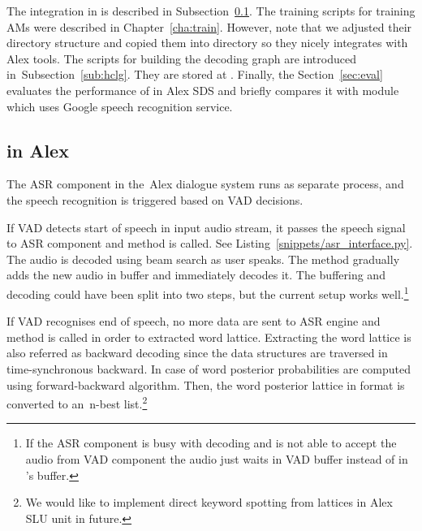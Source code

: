The  integration in  is described in Subsection~\ref{sub:asr_component}.
The training scripts for training \acp{AM} were described in Chapter~\ref{cha:train}.
However, note that we adjusted their directory structure and copied them into  directory so they nicely integrates with Alex tools.
The scripts for building the  decoding graph are introduced in~Subsection~\ref{sub:hclg}.
They are stored at .
Finally, the Section~\ref{sec:eval} evaluates the performance of  in Alex \ac{SDS} and briefly compares it with module which uses Google speech recognition service.

\subsection{ in Alex}
\label{sub:asr_component}
The \ac{ASR} component in the~Alex dialogue system runs as separate process, and the speech recognition is triggered based on \ac{VAD} decisions.

If \ac{VAD} detects start of speech in input audio stream, it passes the speech signal to \ac{ASR} component and  method is called. 
See Listing~\ref{snippets/asr_interface.py}.
The audio is decoded using beam search as user speaks.
The method  gradually adds the new audio in  buffer and immediately decodes it.
The buffering and decoding could have been split into two steps, but the current setup works well.\footnote{If the \ac{ASR} component is busy with decoding and is not able to accept the audio from \ac{VAD} component the audio just waits in \ac{VAD} buffer instead of in 's buffer.}

If \ac{VAD} recognises end of speech, no more data are sent to \ac{ASR} engine and  method is called in order to extracted word lattice.
Extracting the word lattice is also referred as backward decoding since the data structures are traversed in time-synchronous backward.
In case of  word posterior probabilities are computed using forward-backward algorithm.
Then, the word posterior lattice in  format is converted to an~n-best list.\footnote{We would like to implement direct keyword spotting from  lattices in Alex \ac{SLU} unit in future.}

